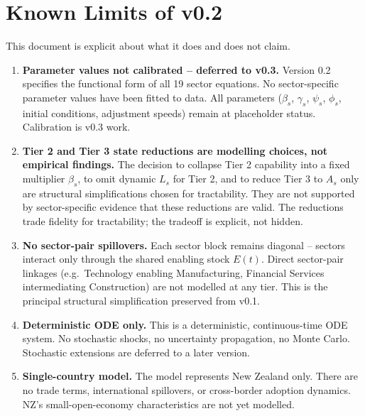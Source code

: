 \documentclass[11pt,a4paper]{article}
\begin{document}
\section{Known Limits of v0.2}
\label{sec:limits}

This document is explicit about what it does and does not claim.

\begin{enumerate}[label=\arabic*.]

  \item \textbf{Parameter values not calibrated -- deferred to v0.3.}
  Version 0.2 specifies the functional form of all 19 sector equations. No sector-specific parameter values have been fitted to data. All parameters ($\beta_s$, $\gamma_s$, $\psi_s$, $\phi_s$, initial conditions, adjustment speeds) remain at placeholder status. Calibration is v0.3 work.

  \item \textbf{Tier 2 and Tier 3 state reductions are modelling choices, not empirical findings.}
  The decision to collapse Tier 2 capability into a fixed multiplier $\beta_s$, to omit dynamic $L_s$ for Tier 2, and to reduce Tier 3 to $A_s$ only are structural simplifications chosen for tractability. They are not supported by sector-specific evidence that these reductions are valid. The reductions trade fidelity for tractability; the tradeoff is explicit, not hidden.

  \item \textbf{No sector-pair spillovers.}
  Each sector block remains diagonal -- sectors interact only through the shared enabling stock $E(t)$. Direct sector-pair linkages (e.g.\ Technology enabling Manufacturing, Financial Services intermediating Construction) are not modelled at any tier. This is the principal structural simplification preserved from v0.1.

  \item \textbf{Deterministic ODE only.}
  This is a deterministic, continuous-time ODE system. No stochastic shocks, no uncertainty propagation, no Monte Carlo. Stochastic extensions are deferred to a later version.

  \item \textbf{Single-country model.}
  The model represents New Zealand only. There are no trade terms, international spillovers, or cross-border adoption dynamics. NZ's small-open-economy characteristics are not yet modelled.


\end{enumerate}
\end{document}
